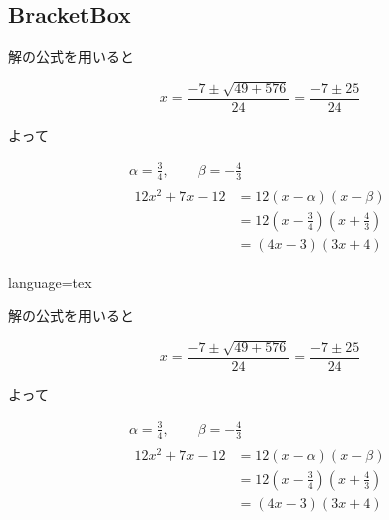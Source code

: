 \documentclass[../main]{subfiles}
\begin{document}
\subsection{BracketBox}
\begin{BracketBox}

    解の公式を用いると

    \begin{equation*}
        x = \frac{-7\pm\sqrt{49+576}}{24} = \frac{-7\pm25}{24}
    \end{equation*}

    よって

    \begin{gather*}
        \alpha = \frac{3}{4}, \qquad \beta = -\frac{4}{3} \\
        \begin{aligned}
            12x^2+7x-12 &= 12(x-\alpha)(x-\beta) \\
                    &= 12(x-\frac{3}{4})(x+\frac{4}{3}) \\
                    &= (4x-3)(3x+4)
        \end{aligned}
    \end{gather*}

\end{BracketBox}
\begin{Code}{language=tex}
\begin{BracketBox}

    解の公式を用いると

    \begin{equation*}
        x = \frac{-7\pm\sqrt{49+576}}{24} = \frac{-7\pm25}{24}
    \end{equation*}

    よって

    \begin{gather*}
        \alpha = \frac{3}{4}, \qquad \beta = -\frac{4}{3} \\
        \begin{aligned}
            12x^2+7x-12 &= 12(x-\alpha)(x-\beta) \\
                    &= 12(x-\frac{3}{4})(x+\frac{4}{3}) \\
                    &= (4x-3)(3x+4)
        \end{aligned}
    \end{gather*}
\end{BracketBox}
\end{Code}
\end{document}
